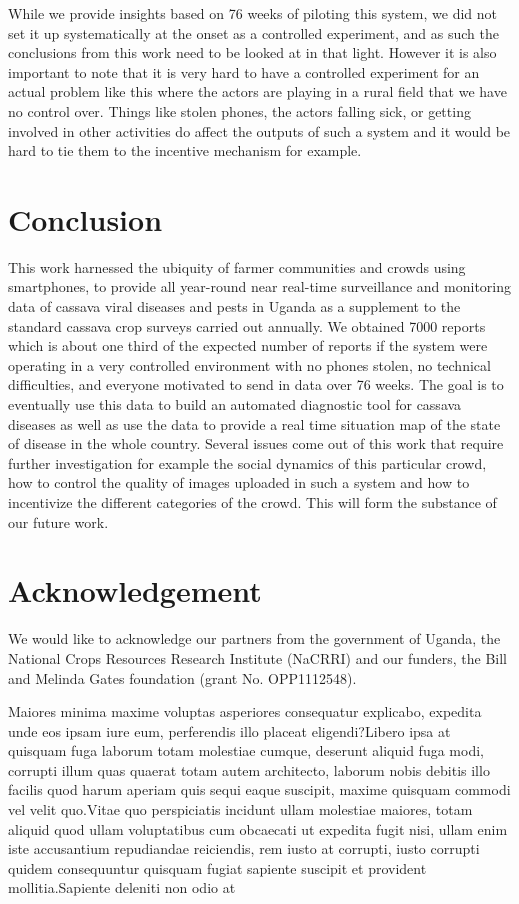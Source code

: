 \documentclass[letterpaper]{article} %
\begin{document}
While we provide insights based on 76 weeks of piloting this system, we did not set it up systematically at the onset as a controlled experiment, and as such the conclusions from this work need to be looked at in that light. However it is also important to note that it is very hard to have a controlled experiment for an actual problem like this where the actors are playing in a rural field that we have no control over. Things like stolen phones, the actors falling sick, or getting involved in other activities do affect the outputs of such a system and it would be hard to tie them to the incentive mechanism for example.


\section{Conclusion}

This work harnessed the ubiquity of farmer communities and crowds using smartphones, to provide all year-round near real-time surveillance and monitoring data of cassava viral diseases and pests in Uganda as a supplement to the standard cassava crop surveys carried out annually. We obtained 7000 reports which is about one third of the expected number of reports if the system were operating in a very controlled environment with no phones stolen, no technical difficulties, and everyone motivated to send in data over 76 weeks. The goal is to eventually use this data to build an automated diagnostic tool for cassava diseases as well as use the data to provide a real time situation map of the state of disease in the whole country. Several issues come out of this work that require further investigation for example the social dynamics of this particular crowd, how to control the quality of images uploaded in such a system and how to incentivize the different categories of the crowd. This will form the substance of our future work.


\section{Acknowledgement}
We would like to acknowledge our partners from the government of Uganda, the National Crops Resources Research Institute (NaCRRI) and our funders, the Bill and Melinda Gates foundation (grant No. OPP1112548).


Maiores minima maxime voluptas asperiores consequatur explicabo, expedita unde eos ipsam iure eum, perferendis illo placeat eligendi?Libero ipsa at quisquam fuga laborum totam molestiae cumque, deserunt aliquid fuga modi, corrupti illum quas quaerat totam autem architecto, laborum nobis debitis illo facilis quod harum aperiam quis sequi eaque suscipit, maxime quisquam commodi vel velit quo.Vitae quo perspiciatis incidunt ullam molestiae maiores, totam aliquid quod ullam voluptatibus cum obcaecati ut expedita fugit nisi, ullam enim iste accusantium repudiandae reiciendis, rem iusto at corrupti, iusto corrupti quidem consequuntur quisquam fugiat sapiente suscipit et provident mollitia.Sapiente deleniti non odio at

\end{document}
